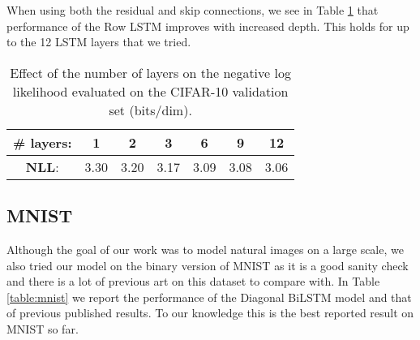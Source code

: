 \documentclass{article}
\begin{document}
When using both the residual and skip connections, we see in Table \ref{table:effect_of_layers} that performance of the Row LSTM improves with increased depth. This holds for up to the 12 LSTM layers that we tried.

\begin{table}[h]
\centering
	\begin{tabular}{ccccccc}
		\toprule
		\textbf{\# layers}: & 1 & 2 & 3 & 6 & 9 & 12 \\ 
	    \midrule
	    \textbf{NLL}: & 3.30 & 3.20 & 3.17 & 3.09 & 3.08 & 3.06 \\
	    \bottomrule
	\end{tabular}
\caption{Effect of the number of layers on the negative log likelihood evaluated on the CIFAR-10 validation set (bits/dim).}
\label{table:effect_of_layers}
\end{table}

\subsection{MNIST}

Although the goal of our work was to model natural images on a large scale, we also tried our model on the binary version \cite{salakhutdinov2008quantitative} of MNIST \cite{lecun1998gradient} as it is a good sanity check and there is a lot of previous art on this dataset to compare with. In Table \ref{table:mnist} we report the performance of the Diagonal BiLSTM model and that of previous published results. To our knowledge this is the best reported result on MNIST so far. 
\end{document}
